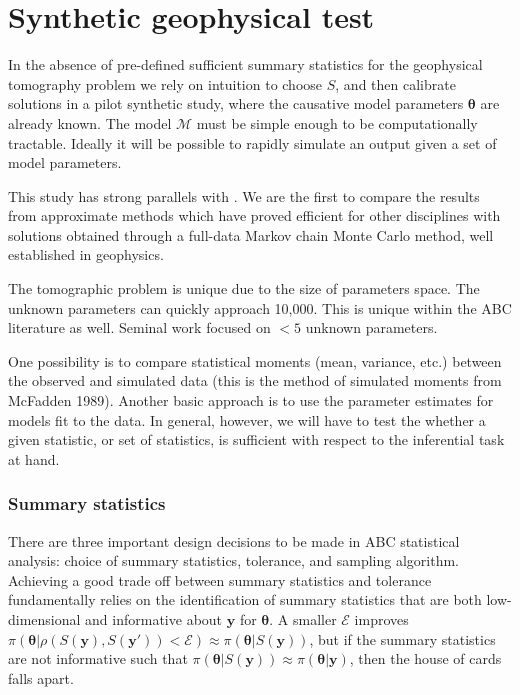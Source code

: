 \chapter{Synthetic geophysical test}

In the absence of pre-defined sufficient summary statistics for the geophysical tomography problem we rely on intuition to choose $S$, and then calibrate solutions in a pilot synthetic study, where the causative model parameters $\bm{\theta}$ are already known. The model $\mathcal{M}$ must be simple enough to be computationally tractable. Ideally it will be possible to rapidly simulate an output given a set of model parameters.  

This study has strong parallels with \citet{Beaumont2002}. We are the first to compare the results from approximate methods which have proved efficient for other disciplines with solutions obtained through a full-data Markov chain Monte Carlo method, well established in geophysics.

The tomographic problem is unique due to the size of parameters space. The unknown parameters can quickly approach 10,000. This is unique within the ABC literature as well. Seminal work focused on $<5$ unknown parameters.

One possibility is to compare statistical moments (mean, variance, etc.) between the observed and simulated data (this is the method of simulated moments from McFadden 1989). Another basic approach is to use the parameter estimates for models fit to the data. In general, however, we will have to test the whether a given statistic, or set of statistics, is sufficient with respect to the inferential task at hand. 



\subsection{Summary statistics}
There are three important design decisions to be made in ABC statistical analysis: choice of summary statistics, tolerance, and sampling algorithm. Achieving a good trade off between summary statistics and tolerance fundamentally relies on the identification of summary statistics that are both low-dimensional and informative about $\bm{y}$ for $\bm{\theta}$. A smaller $\mathcal{E}$ improves $\pi(\bm{\theta}|\rho(S(\bm{y}),S(\bm{y'}))<\mathcal{E}) \approx \pi(\bm{\theta}|S(\bm{y}))$, but if the summary statistics are not informative such that $\pi(\bm{\theta}|S(\bm{y})) \approx \pi(\bm{\theta}|\bm{y})$, then the house of cards falls apart.